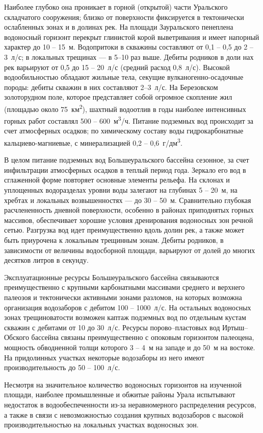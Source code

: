 Наиболее глубоко она проникает в горной (открытой) части Уральского складчатого сооружения; близко от поверхности фиксируется в тектонически ослабленных зонах и в долинах рек. На площади Зауральского пенеплена водоносный горизонт перекрыт глинистой корой выветривания и имеет напорный характер до 10 -- 15~м. Водопритоки в скважины составляют от 0,1  -- 0,5 до 2  -- 3~л/с; в локальных трещинах  --- в 5–10 раз выше. Дебиты родников в доли нах рек варьируют от 0,5 до 15  -- 20~л/с (средний расход 0,8~л/с).
Высокой водообильностью обладают жильные тела, секущие вулканогенно-осадочные породы: дебиты скважин в них составляют 2–3~л/с. На Березовском золоторудном поле, которое представляет собой огромное скопление жил (площадью около 75~км\textsuperscript{2}), шахтный водоотлив в годы наиболее интенсивных горных работ составлял 500  -- 600~м\textsuperscript{3}/ч. Питание подземных вод происходит за счет атмосферных осадков; по химическому составу воды гидрокарбонатные кальциево-магниевые, с минерализацией 0,2  -- 0,6~г/дм\textsuperscript{3}.

В целом питание подземных вод Большеуральского бассейна сезонное, за счет инфильтрации атмосферных осадков в теплый период года. Зеркало его вод в сглаженной форме повторяет основные элементы рельефа. На склонах и уплощенных водоразделах уровни воды залегают на глубинах 5  -- 20~м, на хребтах и локальных возвышенностях  --- до 30  -- 50~м. Сравнительно глубокая расчлененность дневной поверхности, особенно в районах приподнятых горных массивов, обеспечивает хорошие условия дренирования водоносных зон речной сетью. Разгрузка вод идет преимущественно вдоль долин рек, а также может быть приурочена к локальным трещинным зонам. Дебиты родников, в зависимости от величины водосборной площади, варьируют от долей до многих десятков литров в секунду.

Эксплуатационные ресурсы Большеуральского бассейна связываются преимущественно с крупными карбонатными массивами среднего и верхнего палеозоя и тектонически активными зонами разломов, на которых возможна организация водозаборов с дебитом 100 -- 1000~л/с. На остальных водоносных зонах трещиноватости возможен каптаж подземных вод по отдельным кустам скважин с дебитами от 10 до 30~л/с. Ресурсы порово--пластовых вод Иртыш--Обского бассейна связаны преимущественно с опоковым горизонтом палеоцена, мощность обводненной толщи которого 3 -- 4~м на западе и до 50~м на востоке. На придолинных участках некоторые водозаборы из него имеют производительность до 50 -- 100~л/с.

Несмотря на значительное количество водоносных горизонтов на изученной площади, наиболее промышленные и обжитые районы Урала испытывают недостаток в водообеспеченности из-за неравномерного распределения ресурсов, а также в связи с невозможностью создания крупных водозаборов с высокой производительностью на локальных участках водоносных зон.

